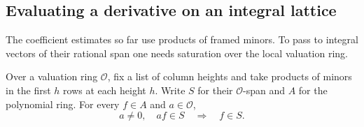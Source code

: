 \subsection{Evaluating a derivative on an integral lattice}
\hypertarget{source-integral-jets}{}

The coefficient estimates so far use products of framed minors. To pass to integral vectors of their rational span one needs saturation over the local valuation ring.

\begin{lemma}\label{lem:saturated-minor-polynomials}
Over a valuation ring \(\mathcal O\), fix a list of column
heights and take products of minors in the first \(h\) rows
at each height \(h\). Write \(S\) for their \(\mathcal O\)-span and \(A\) for the polynomial ring. For every \(f\in A\) and \(a\in\mathcal O\),
\[
 a\ne0,\quad af\in S\quad\Longrightarrow\quad f\in S.
\]

\end{lemma}


